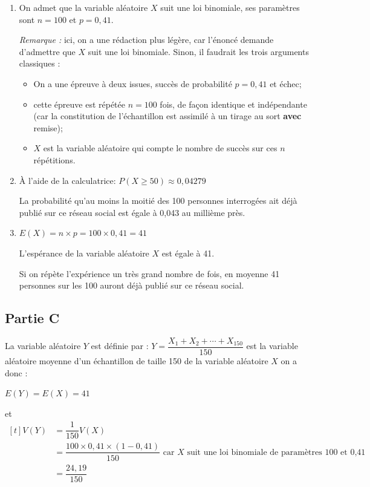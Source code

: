 \begin{enumerate}
	\item On admet que la variable aléatoire $X$ suit une loi binomiale, ses  paramètres sont $n=100$ et  $p=0,41$.

	\emph{Remarque :} ici, on a une rédaction plus légère, car l'énoncé demande d'admettre que $X$ suit une loi binomiale. Sinon, il faudrait les trois arguments classiques :

	\begin{itemize}
		\item On a une épreuve à deux issues, succès de probabilité $p = 0,41$ et échec;
		\item cette épreuve est répétée $n = 100$ fois, de façon identique et indépendante (car la constitution de l'échantillon est assimilé à un tirage au sort \textbf{avec} remise);
		\item $X$ est la variable aléatoire qui compte le nombre de succès sur ces $n$ répétitions.
	\end{itemize}

	\item À l'aide de la calculatrice: $P(X \geq 50) \approx 0,04279 $

	La probabilité qu'au moins la moitié des 100 personnes interrogées ait déjà publié sur ce réseau social est égale à   0,043 au millième près.

	\item  $E(X) = n\times p = 100 \times 0,41 =41$

	L'espérance de la variable aléatoire $X$ est égale à 41.

	Si on répète l'expérience un très grand nombre de fois, en moyenne 41 personnes sur les 100 auront déjà publié sur ce réseau social.
\end{enumerate}

\subsection*{Partie C}


La variable aléatoire $Y$ est définie par :
$Y=\dfrac{X_{1}+X_{2}+\cdots+X_{150}}{150}$ est la variable aléatoire  moyenne d'un échantillon  de taille 150 de la variable aléatoire $X$ on a donc :



$E\left(Y\right) = E(X)= 41$

et   $\begin{aligned}[t] V\left(Y\right) &= \dfrac{1}{150} V(X)\\
	&  =  \dfrac{100 \times 0,41 \times (1-0,41)}{150} \text{ car } X \text{ suit une loi binomiale de paramètres 100 et 0,41}\\
	&= \dfrac{24,19}{150}
\end{aligned} $


